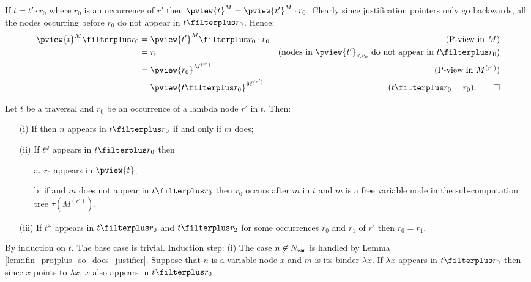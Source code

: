 \begin{compactitem}


    \item If $t =  t' \cdot r_0$ where $r_0$ is an occurrence of $r'$ then $\pview{t}^M = \pview{t'}^M \cdot r_0$. Clearly since justification pointers only go backwards, all the nodes occurring before $r_0$ do not appear in $t \filterplus r_0$. Hence:
        \begin{align*}
        \pview{t}^M \filterplus  r_0
            &=  \pview{t'}^M \filterplus  r_0 \cdot r_0 & (\mbox{P-view in $M$})\\
            &=  r_0                                     & (\mbox{nodes in $\pview{t'}_{< r_0}$ do not appear in $t \filterplus  r_0$}) \\
            &=  \pview{r_0 }^{M^{(r')}}                 & (\mbox{P-view in $M^{(r')}$})\\
            &= \pview{t \filterplus  r_0 }^{M^{(r')}} & \mbox{($t \filterplus  r_0 = r_0$)}. \qed
        \end{align*}
    \end{compactitem}



\begin{lemma}
\label{lem:if_binder_beforeafter_r0}
Let $t$ be a traversal and $r_0$ be an occurrence of a lambda node $r'$ in $t$.
Then:
\begin{itemize}
\item[(i)] If  then $n$ appears in $t\filterplus r_0$ if and only if $m$ does;

\item[(ii)] If $t^\omega$ appears in $t\filterplus r_0$ then
    \begin{itemize}
    \item[a.] $r_0$ appears in $\pview{t}$;
    \item[b.] if  and $m$ does not appear in $t\filterplus r_0$ then
    $r_0$ occurs after $m$ in $t$ and $m$ is a free variable node in the sub-computation tree $\tau(M^{(r')})$.
    \end{itemize}
\item[(iii)] If $t^\omega$ appears in $t\filterplus r_0$
and $t\filterplus r_2$ for some occurrences $r_0$ and $r_1$ of $r'$ then $r_0 = r_1$.
\end{itemize}
\end{lemma}
\proof By induction on $t$. The base case is trivial. Induction
step: (i) The case $n\not\in  N_{\sf var}$ is handled by Lemma
\ref{lem:ifin_projplus_so_does_justifier}. Suppose that $n$ is a
variable node $x$ and $m$ is its binder $\lambda \overline{x}$. If
$\lambda \overline{x}$ appears in $t\filterplus r_0$ then since $x$
points to $\lambda \overline{x}$, $x$ also appears in $t\filterplus
r_0$.

